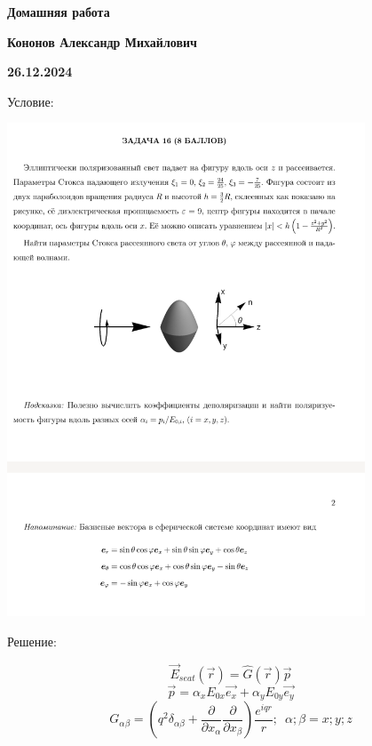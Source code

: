 \documentclass[12pt]{article}
\begin{document}
\begin{large}
\begin{center}
\LARGE \textbf{Домашняя работа}
\par
\LARGE \textbf{Кононов Александр Михайлович}
\par
    \textbf{26.12.2024}
\end{center}
\par Условие:
\par
\includegraphics[width=0.8\textwidth]{photo.png}
\par Решение:
\par
\par
\[
    \overrightarrow{E}_{seat} \left( \vec{r} \right) = \widehat{G} \left( \vec{r} \right) \vec{p}
\]
\[
    \vec{p} = \alpha_x E_{0x} \vec{e_x} + \alpha_y E_{0y} \vec{e_y}
\]
\[
    G_{\alpha \beta } = \left( q^2 \delta_{\alpha \beta} + \frac{\partial }{\partial x_\alpha}\frac{\partial }{\partial x_\beta} \right) \frac{e^{iqr}}{r} ;  \, \, \, \alpha; \beta = x; y; z
\]
\end{large}
\end{document}
